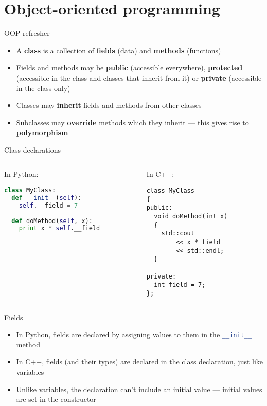 \part{Object-oriented programming}
\frame{\partpage}

\begin{frame}[fragile]{OOP refresher}
    \begin{itemize}
        \item A \textbf{class} is a collection of \textbf{fields} (data) and \textbf{methods} (functions)
        \item Fields and methods may be \textbf{public} (accessible everywhere), \textbf{protected} (accessible in the class and classes that inherit from it) or \textbf{private} (accessible in the class only)
        \item Classes may \textbf{inherit} fields and methods from other classes
        \item Subclasses may \textbf{override} methods which they inherit --- this gives rise to \textbf{polymorphism}
    \end{itemize}
\end{frame}

\begin{frame}[fragile]{Class declarations}
    \begin{columns}[onlytextwidth]
		\begin{column}{0.48\textwidth}
			In Python:
			\begin{lstlisting}[language=Python]
class MyClass:
  def __init__(self):
    self.__field = 7
    
  def doMethod(self, x):
    print x * self.__field
            \end{lstlisting}
		\end{column}
		\pause
		\begin{column}{0.48\textwidth}
			In C++:
			\begin{lstlisting}
class MyClass
{
public:
  void doMethod(int x)
  {
    std::cout
        << x * field
        << std::endl;
  }
    
private:
  int field = 7;
};
			\end{lstlisting}
		\end{column}
	\end{columns}
\end{frame}

\begin{frame}[fragile]{Fields}
    \begin{itemize}
        \item In Python, fields are declared by assigning values to them in the \lstinline[language=Python]{__init__} method
        \item In C++, fields (and their types) are declared in the class declaration, just like variables
        \item Unlike variables, the declaration can't include an initial value --- initial values are set in the constructor
    \end{itemize}
\end{frame}

